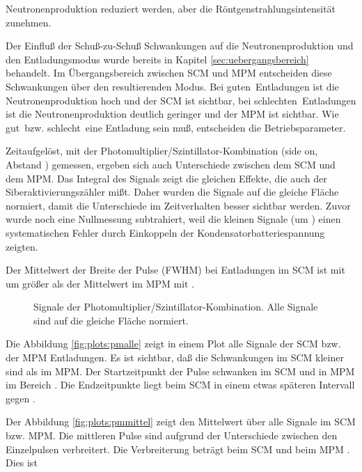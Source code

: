 Neutronenproduktion reduziert werden, aber die
Röntgenstrahlungsintensität zunehmen.
\par
Der Einfluß der Schuß-zu-Schuß Schwankungen auf die Neutronenproduktion
und den Entladungsmodus wurde bereits in Kapitel
\vref{sec:uebergangsbereich} behandelt. Im Übergangsbereich zwischen
SCM und MPM entscheiden diese Schwankungen über den resultierenden
Modus. Bei \glqq guten\grqq\ Entladungen ist die Neutronenproduktion
hoch und der SCM ist sichtbar, bei \glqq schlechten\grqq\ Entladungen
ist die Neutronenproduktion deutlich geringer und der MPM ist sichtbar.
Wie \glqq gut\grqq\ bzw. \glqq schlecht\grqq\ eine Entladung sein muß,
entscheiden die Betriebsparameter.
%
\par
Zeitaufgelöst, mit der Photomultiplier/Szintillator-Kombination (side
on, Abstand ) gemessen, ergeben sich auch Unterschiede
zwischen dem SCM und dem MPM. Das Integral des Signals zeigt die
gleichen Effekte, die auch der Siber\-akti\-vierungs\-zähler mißt.
Daher wurden die Signale auf die gleiche Fläche normiert, damit die
Unterschiede im Zeitverhalten besser sichtbar werden. Zuvor wurde noch
eine Nullmessung subtrahiert, weil die kleinen Signale (um
) einen systematischen Fehler durch Einkoppeln der
Kondensatorbatteriespannung zeigten.
\par
Der Mittelwert der Breite der Pulse (FWHM) bei Entladungen im SCM ist
mit  um  größer als der Mittelwert im
MPM mit .
%
\par
\begin{figure}[H]
  \center
  \caption{Signale der Photomultiplier/Szintillator-Kombination. Alle Signale
     sind auf die gleiche Fläche normiert.}
  \label{fig:plots:pmalle}
\end{figure}
%
\par
Die Abbildung \vref{fig:plots:pmalle} zeigt in einem Plot alle
Signale der SCM bzw. der MPM Entladungen. Es ist sichtbar, daß die
Schwankungen im SCM kleiner sind als im MPM. Der Startzeitpunkt
der Pulse schwanken im SCM und in MPM im Bereich . Die Endzeitpunkte liegt beim SCM in einem etwas späteren
Intervall  gegen .
\par
Der Abbildung \vref{fig:plots:pmmittel} zeigt den Mittelwert über
alle Signale im SCM bzw. MPM. Die mittleren Pulse sind aufgrund der
Unterschiede zwischen den Einzelpulsen verbreitert. Die Verbreiterung
beträgt beim SCM  und beim MPM . Dies ist
